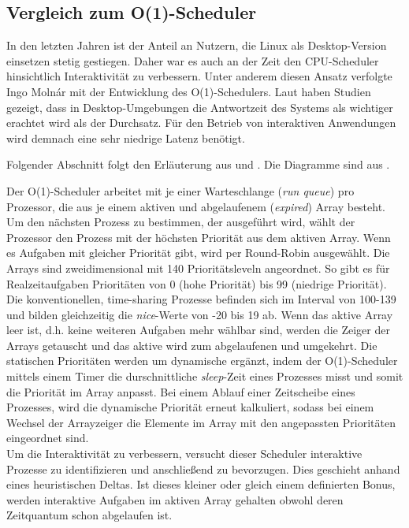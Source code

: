 \subsection{Vergleich zum O(1)-Scheduler}\label{s:compO1}
In den letzten Jahren ist der Anteil an Nutzern, die Linux als Desktop-Version einsetzen stetig gestiegen. Daher war es auch an der Zeit den CPU-Scheduler hinsichtlich Interaktivität zu verbessern. Unter anderem diesen Ansatz verfolgte Ingo Molnár mit der Entwicklung des O(1)-Sche\-dulers. Laut \cite{papercomparison} haben Studien gezeigt, dass in Desktop-Umgebungen die Antwortzeit des Systems als wichtiger erachtet wird als der Durchsatz. Für den Betrieb von interaktiven Anwendungen wird demnach eine sehr niedrige Latenz benötigt. 

Folgender Abschnitt folgt den Erläuterung aus \cite{asilberschatz} und \cite{papercomparison}. Die Diagramme sind aus \cite{papercomparison}.

Der O(1)-Scheduler arbeitet mit je einer Warteschlange (\textit{run queue}) pro Prozessor, die aus je einem aktiven und abgelaufenem (\textit{expired}) Array besteht. Um den nächsten Prozess zu bestimmen, der ausgeführt wird, wählt der Prozessor den Prozess mit der höchsten Priorität aus dem aktiven Array. Wenn es Aufgaben mit gleicher Priorität gibt, wird per Round-Robin ausgewählt. Die Arrays sind zweidimensional mit 140 Prioritätsleveln angeordnet. So gibt es für Realzeitaufgaben Prioritäten von 0 (hohe Priorität) bis 99 (niedrige Priorität). Die konventionellen, time-shar\-ing Prozesse befinden sich im Interval von 100-139 und bilden gleichzeitig die \textit{nice}-Werte von -20 bis 19 ab. Wenn das aktive Array leer ist, d.h. keine weiteren Aufgaben mehr wählbar sind, werden die Zeiger der Arrays getauscht und das aktive wird zum abgelaufenen und umgekehrt. Die statischen Prioritäten werden um dynamische ergänzt, indem der O(1)-Scheduler mittels einem Timer die durschnittliche \textit{sleep}-Zeit eines Prozesses misst und somit die Priorität im Array anpasst. Bei einem Ablauf einer Zeitscheibe eines Prozesses, wird die dynamische Priorität erneut kalkuliert, sodass bei einem Wechsel der Arrayzeiger die Elemente im Array mit den angepassten Prioritäten eingeordnet sind. \\
Um die Interaktivität zu verbessern, versucht dieser Scheduler  interaktive Prozesse zu identifizieren und anschließend zu bevorzugen. Dies geschieht anhand eines heu\-ris\-tisch\-en Deltas. Ist dieses kleiner oder gleich einem definierten Bonus, werden interaktive Aufgaben im aktiven Array gehalten obwohl deren Zeitquantum schon abgelaufen ist.

